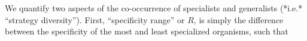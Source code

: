 We quantify two aspects of the co-occurrence of specialists and
generalists (*i.e.* “strategy diversity”). First, “specificity range”
or $R$, is simply the difference between the specificity of the most and
least specialized organisms, such that
